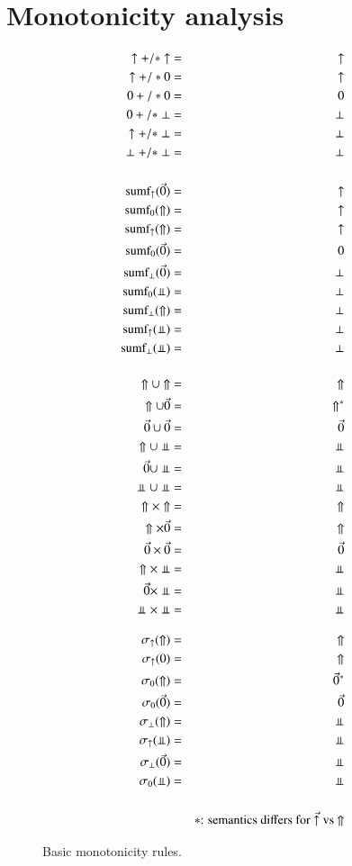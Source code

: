 \documentclass{article}
\begin{document}
\section{Monotonicity analysis}
\begin{figure}
\begin{eqnarray*}
\uparrow +/* \uparrow &=& \uparrow
\\
\uparrow +/* 0 &=& \uparrow
\\
0 +/* 0 &=& 0
\\
0 +/* \perp &=& \perp
\\
\uparrow +/* \perp &=& \perp
\\
\perp +/* \perp &=& \perp
%
%
%
\\[3ex]
\algsumf_{\uparrow}(\vec{0}) &=& \uparrow
\\
\algsumf_{0}(\Uparrow) &=& \uparrow
\\
\algsumf_{\uparrow}(\Uparrow) &=& \uparrow
\\
\algsumf_{0}(\vec{0}) &=& 0
\\
\algsumf_{\perp}(\vec{0}) &=& \perp
\\
\algsumf_{0}(\Perp) &=& \perp
\\
\algsumf_{\perp}(\Uparrow) &=& \perp
\\
\algsumf_{\uparrow}(\Perp) &=& \perp
\\
\algsumf_{\perp}(\Perp) &=& \perp
%
%
\\[3ex]
\Uparrow \cup \Uparrow &=& \Uparrow
\\
\Uparrow \cup \vec{0} &=& \Uparrow^{\ast}
\\
\vec{0} \cup \vec{0} &=& \vec{0}
\\
\Uparrow \cup \Perp &=& \Perp
\\
\vec{0} \cup \Perp &=& \Perp
\\
\Perp \cup \Perp &=& \Perp
\\
\Uparrow \times \Uparrow &=& \Uparrow
\\
\Uparrow \times \vec{0} &=& \Uparrow
\\
\vec{0} \times \vec{0} &=& \vec{0}
\\
\Uparrow \times \Perp &=& \Perp
\\
\vec{0} \times \Perp &=& \Perp
\\
\Perp \times \Perp &=& \Perp
%
%
\\[2ex]
\sigma_{\uparrow}(\Uparrow) &=& \Uparrow
\\
\sigma_{\uparrow}(0) &=& \Uparrow
\\
\sigma_{0}(\Uparrow) &=& \vec{0}^{\ast}
\\
\sigma_{0}(\vec{0}) &=& \vec{0}
\\
\sigma_{\perp}(\Uparrow) &=& \Perp
\\
\sigma_{\uparrow}(\Perp) &=& \Perp
\\
\sigma_{\perp}(\vec{0}) &=& \Perp
\\
\sigma_{0}(\Perp) &=& \Perp
%
%
\\[3ex]
& & \mbox{$\ast$: semantics differs for $\vec{\uparrow}$ vs $\Uparrow$}
\end{eqnarray*}
\caption{Basic monotonicity rules.}
\end{figure}
\end{document}
